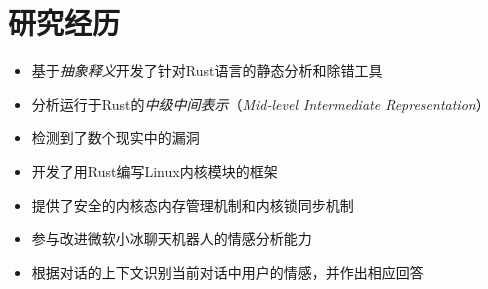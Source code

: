 \documentclass[11pt,a4paper,roman]{moderncv} %
\begin{document}


\section{研究经历}

{
	\begin{itemize}
    \item 基于\textit{抽象释义}开发了针对Rust语言的静态分析和除错工具
		\item 分析运行于Rust的\textit{中级中间表示}（\textit{Mid-level Intermediate Representation}）
		\item 检测到了数个现实中的漏洞
	\end{itemize}
}

{
	\begin{itemize}
		\item 开发了用Rust编写Linux内核模块的框架
		\item 提供了安全的内核态内存管理机制和内核锁同步机制
	\end{itemize}
}

{
    \begin{itemize}
    	\item 参与改进微软小冰聊天机器人的情感分析能力
	    \item 根据对话的上下文识别当前对话中用户的情感，并作出相应回答
	\end{itemize}
}
\end{document}
